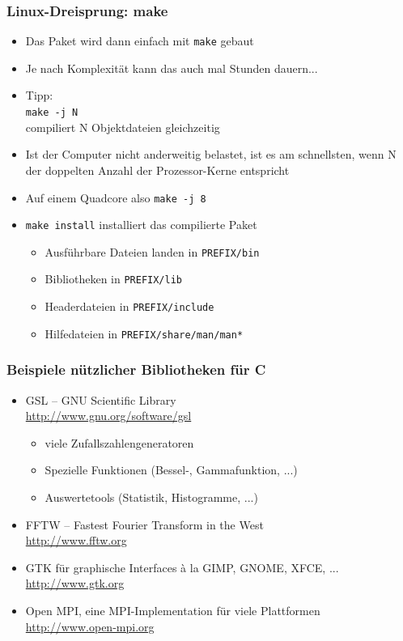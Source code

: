 \documentclass{slides}
\begin{document}
\begin{frame}[fragile]
  \frametitle{Linux-Dreisprung: make}

  \begin{itemize}
  \item Das Paket wird dann einfach mit \lstinline!make! gebaut
  \item Je nach Komplexität kann das auch mal Stunden dauern...
  \item Tipp:\\
    {\alerted\lstinline!make -j N!}\\
    compiliert N Objektdateien gleichzeitig
  \item Ist der Computer nicht anderweitig belastet, ist es am schnellsten, wenn N der doppelten
    Anzahl der Prozessor-Kerne entspricht
  \item Auf einem Quadcore also \lstinline!make -j 8!
  \item \lstinline!make install! installiert das compilierte Paket
    \begin{itemize}
    \item Ausführbare Dateien landen in \lstinline!PREFIX/bin!
    \item Bibliotheken in \lstinline!PREFIX/lib!
    \item Headerdateien in \lstinline!PREFIX/include!
    \item Hilfedateien in \lstinline!PREFIX/share/man/man*!
    \end{itemize}
  \end{itemize}
\end{frame}

\begin{frame}
  \frametitle{Beispiele nützlicher Bibliotheken für C}
  \begin{itemize}
  \item GSL -- GNU Scientific Library\\
    \url{http://www.gnu.org/software/gsl}\\
    \begin{itemize}
    \item viele Zufallszahlengeneratoren
    \item Spezielle Funktionen (Bessel-, Gammafunktion, ...)
    \item Auswertetools (Statistik, Histogramme, ...)
    \end{itemize}
  \item FFTW -- Fastest Fourier Transform in the West\\
    \url{http://www.fftw.org}
  \item GTK für graphische Interfaces à la GIMP, GNOME, XFCE, ...\\
    \url{http://www.gtk.org}
  \item Open MPI, eine MPI-Implementation für viele Plattformen\\
    \url{http://www.open-mpi.org}
  \end{itemize}
\end{frame}
\end{document}
